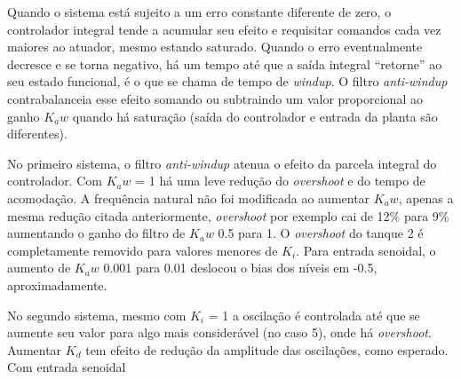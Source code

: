 Quando o sistema está sujeito a um erro constante diferente de zero, o controlador integral tende a acumular seu efeito e requisitar comandos cada vez maiores ao atuador, mesmo estando saturado. Quando o erro eventualmente decresce e se torna negativo, há um tempo até que a saída integral “retorne” ao seu estado funcional, é o que se chama de tempo de \emph{windup}. O filtro \emph{anti-windup} contrabalanceia esse efeito somando ou subtraindo um valor proporcional ao ganho $K_aw$ quando há saturação (saída do controlador e entrada da planta são diferentes).

No primeiro sistema, o filtro \emph{anti-windup} atenua o efeito da parcela integral do controlador. Com $K_aw$ = 1 há uma leve redução do \emph{overshoot} e do tempo de acomodação. A frequência natural não foi modificada ao aumentar $K_aw$, apenas a mesma redução citada anteriormente, \emph{overshoot} por exemplo cai de 12\% para 9\%  aumentando o ganho do filtro de $K_aw$ 0.5 para 1. O \emph{overshoot} do tanque 2 é completamente removido para valores menores de $K_i$. Para entrada senoidal, o aumento de $K_aw$ 0.001 para 0.01 deslocou o bias dos níveis em -0.5, aproximadamente.

No segundo sistema, mesmo com $K_i$ = 1 a oscilação é controlada até que se aumente seu valor para algo mais considerável (no caso 5), onde há \emph{overshoot}. Aumentar $K_d$ tem efeito de redução da amplitude das oscilações, como esperado. Com entrada senoidal 

